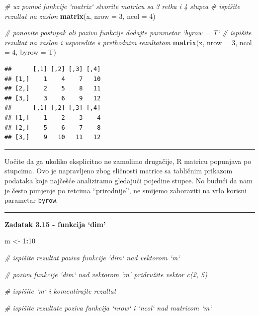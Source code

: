 \documentclass[]{book}
\newenvironment{Shaded}{\begin{snugshade}}{\end{snugshade}}
\newcommand{\KeywordTok}[1]{\textcolor[rgb]{0.13,0.29,0.53}{\textbf{#1}}}
\newcommand{\DataTypeTok}[1]{\textcolor[rgb]{0.13,0.29,0.53}{#1}}
\newcommand{\DecValTok}[1]{\textcolor[rgb]{0.00,0.00,0.81}{#1}}
\newcommand{\StringTok}[1]{\textcolor[rgb]{0.31,0.60,0.02}{#1}}
\newcommand{\CommentTok}[1]{\textcolor[rgb]{0.56,0.35,0.01}{\textit{#1}}}
\newcommand{\OperatorTok}[1]{\textcolor[rgb]{0.81,0.36,0.00}{\textbf{#1}}}
\newcommand{\NormalTok}[1]{#1}
\theoremstyle{definition}
\theoremstyle{definition}
\theoremstyle{definition}
\theoremstyle{remark}
\begin{document}
\begin{Shaded}
\begin{Highlighting}[]
\CommentTok{# uz pomoć funkcije `matrix` stvorite matricu sa 3 retka i 4 stupca}
\CommentTok{# ispišite rezultat na zaslon}
\KeywordTok{matrix}\NormalTok{(x, }\DataTypeTok{nrow =} \DecValTok{3}\NormalTok{, }\DataTypeTok{ncol =} \DecValTok{4}\NormalTok{)}

\CommentTok{# ponovite postupak ali pozivu funkcije dodajte parametar `byrow = T`}
\CommentTok{# ispišite rezultat na zaslon i usporedite s prethodnim rezultatom}
\KeywordTok{matrix}\NormalTok{(x, }\DataTypeTok{nrow =} \DecValTok{3}\NormalTok{, }\DataTypeTok{ncol =} \DecValTok{4}\NormalTok{, }\DataTypeTok{byrow =}\NormalTok{ T)}
\end{Highlighting}
\end{Shaded}

\begin{verbatim}
##      [,1] [,2] [,3] [,4]
## [1,]    1    4    7   10
## [2,]    2    5    8   11
## [3,]    3    6    9   12
##      [,1] [,2] [,3] [,4]
## [1,]    1    2    3    4
## [2,]    5    6    7    8
## [3,]    9   10   11   12
\end{verbatim}

\begin{center}\rule{0.5\linewidth}{\linethickness}\end{center}

Uočite da ga ukoliko eksplicitno ne zamolimo drugačije, R matricu
popunjava po stupcima. Ovo je napravljeno zbog sličnosti matrice sa
tabličnim prikazom podataka koje najčešće analiziramo gledajući pojedine
stupce. No budući da nam je često punjenje po retcima ``prirodnije'', ne
smijemo zaboraviti na vrlo korisni parametar \texttt{byrow}.

\begin{center}\rule{0.5\linewidth}{\linethickness}\end{center}

\textbf{Zadatak 3.15 - funkcija `dim'}

\begin{Shaded}
\begin{Highlighting}[]
\NormalTok{m <-}\StringTok{ }\DecValTok{1}\OperatorTok{:}\DecValTok{10}

\CommentTok{# ispišite rezultat poziva funkcije `dim` nad vektorom `m`}

\CommentTok{# pozivu funkcije `dim` nad vektorom `m` pridružite vektor c(2, 5)}

\CommentTok{# ispišite `m` i komentirajte rezultat}

\CommentTok{# ispišite rezultate poziva funkcija `nrow` i `ncol` nad matricom `m`}
\end{Highlighting}
\end{Shaded}
\end{document}
